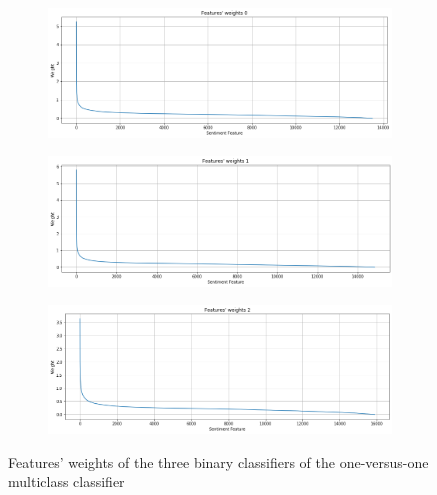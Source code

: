 
\begin{figure}[H]
	\centering
	\begin{subfigure}{1\textwidth} %
		\includegraphics[width=\textwidth]{figures/conf_matrices/twitter_snt_svm/svm_fs_1.png}
	\end{subfigure}
	\begin{subfigure}{1\textwidth} %
		\includegraphics[width=\textwidth]{figures/conf_matrices/twitter_snt_svm/svm_fs_2.png}
	\end{subfigure}
	\begin{subfigure}{1\textwidth} %
		\includegraphics[width=\textwidth]{figures/conf_matrices/twitter_snt_svm/svm_fs_3.png}
	\end{subfigure}
	\caption{Features' weights of the three binary classifiers of the one-versus-one multiclass classifier} %
	\label{fig:svm-fs}
\end{figure}

